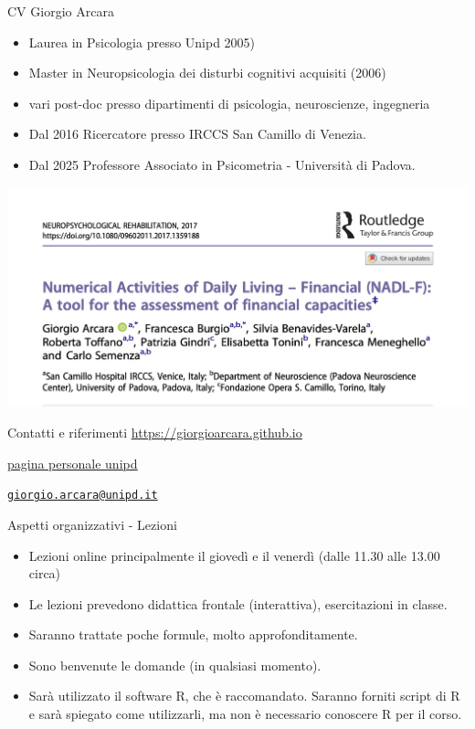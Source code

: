 \documentclass[
  ignorenonframetext,
]{beamer}
\providecommand{\tightlist}{%
  \setlength{\itemsep}{0pt}\setlength{\parskip}{0pt}}
\begin{document}
\begin{frame}{CV Giorgio Arcara}
\label{cv-giorgio-arcara}
\footnotesize

\begin{itemize}[<+->]
\item
  Laurea in Psicologia presso Unipd 2005)
\item
  Master in Neuropsicologia dei disturbi cognitivi acquisiti (2006)
\item
  vari post-doc presso dipartimenti di psicologia, neuroscienze,
  ingegneria
\item
  Dal 2016 Ricercatore presso IRCCS San Camillo di Venezia.
\item
  Dal 2025 Professore Associato in Psicometria - Università di Padova.
\end{itemize}

\pause

\hfill
\includegraphics[width=0.6\linewidth,height=\textheight,keepaspectratio]{Figures/NADL_F.png}
\end{frame}

\begin{frame}{Contatti e riferimenti}
\label{contatti-e-riferimenti}
\href{https://giorgioarcara.github.io}{\ul{https://giorgioarcara.github.io}}

\href{https://www.dpg.unipd.it/category/ruoli/personale-docente?key=4D0707A2DD6FCCD50B90E4C9F316A625}{\ul{pagina
personale unipd}}

\href{mailto:giorgio.arcara@unipd.it}{\nolinkurl{giorgio.arcara@unipd.it}}
\end{frame}

\begin{frame}{Aspetti organizzativi - Lezioni}
\label{aspetti-organizzativi---lezioni}
\begin{itemize}[<+->]
\tightlist
\item
  Lezioni online principalmente il giovedì e il venerdì (dalle 11.30
  alle 13.00 circa)
\item
  Le lezioni prevedono didattica frontale (interattiva), esercitazioni
  in classe.
\item
  Saranno trattate poche formule, molto approfonditamente.
\item
  Sono benvenute le domande (in qualsiasi momento).
\item
  Sarà utilizzato il software R, che è raccomandato. Saranno forniti
  script di R e sarà spiegato come utilizzarli, ma non è necessario
  conoscere R per il corso.
\end{itemize}
\end{frame}
\end{document}

